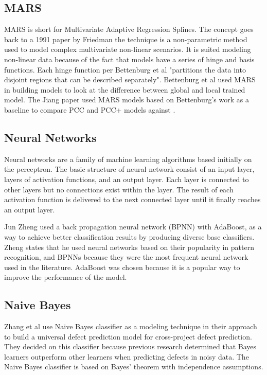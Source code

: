 \documentclass{sig-alternate-05-2015}
\begin{document}
\subsection{MARS}
MARS is short for Multivariate Adaptive Regression Splines.  The concept goes back to a 1991 paper by Friedman the technique is a non-parametric method used to model complex multivariate non-linear scenarios.  It is suited modeling non-linear data because of the fact that models have a series of hinge and basis functions.  Each hinge function per Bettenburg et al "partitions the data into disjoint regions that can be described separately"\cite{Bettenburg}.  Bettenburg et al used MARS in building models to look at the difference between global and local trained model.  The Jiang paper used MARS models based on Bettenburg's work as a baseline to compare PCC and PCC+ models against \cite{Jiang}. 

\subsection{Neural Networks}
Neural networks are a family of machine learning algorithms based initially on the perceptron. The basic structure of neural network consist of an input layer, layers of activation functions, and an output layer. Each layer is connected to other layers but no connections exist within the layer. The result of each activation function is delivered to the next connected layer until it finally reaches an output layer.   

Jun Zheng \cite{zheng2010} used a back propagation neural network (BPNN) with AdaBoost, as a way to achieve better classification results by producing diverse base classifiers. Zheng states that he used neural networks based on their popularity in pattern recognition, and BPNNs because they were the most frequent neural network used in the literature. AdaBoost was chosen because it is a popular way to improve the performance of the model.

\subsection{Naive Bayes}
Zhang et al \cite{Zhang2014} use Naive Bayes classifier as a modeling technique in their approach to build a universal defect prediction model for cross-project defect prediction. They decided on this classifier because previous research determined that Bayes learners outperform other learners when predicting defects in noisy data. The Naive Bayes classifier is based on Bayes' theorem with independence assumptions.
\end{document}
